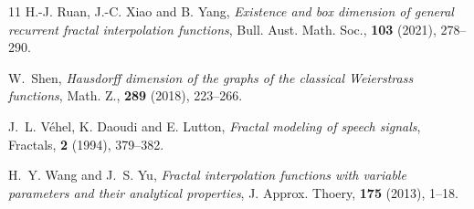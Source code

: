 \documentclass[11pt]{amsart}
\theoremstyle{definition}
\theoremstyle{remark}
\numberwithin{equation}{section}
\begin{document}
\begin{thebibliography}{11}
 {\sc H.-J. Ruan, J.-C. Xiao and B. Yang}, {\em Existence and box dimension of general recurrent fractal interpolation functions}, Bull. Aust. Math. Soc., {\bf 103} (2021), 278--290.



 {\sc W.~Shen}, {\em Hausdorff dimension of the graphs of the classical Weierstrass functions}, 
Math. Z., {\bf 289} (2018), 223--266.

 {\sc J.~L. V\'{e}hel, K. Daoudi and E. Lutton}, {\em Fractal modeling of speech signals}, Fractals, {\bf 2} (1994), 379--382.

 {\sc H.~Y. Wang and J.~S. Yu}, {\em Fractal interpolation functions with variable parameters and their analytical properties}, J. Approx. Thoery, {\bf 175} (2013), 1--18.















\end{thebibliography}
\end{document}
